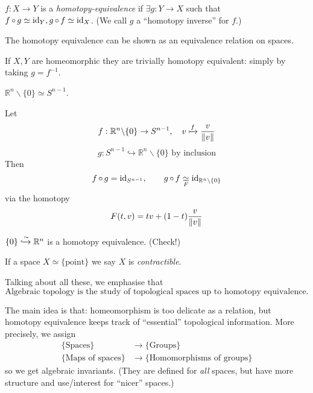 \documentclass[a4paper,11pt]{article}
\begin{document}
	\begin{defi}
		$f: X \to Y$ is a \emph{homotopy-equivalence} if $\exists g : Y \to X$ such that $f \operatorname{\circ} g \simeq \operatorname{id}_Y, g \operatorname{\circ} f \simeq \operatorname{id}_X$. (We call $g$ a ``homotopy inverse'' for $f$.)
	\end{defi}

	\begin{nt}
		The homotopy equivalence can be shown as an equivalence relation on spaces.
	\end{nt}

	\begin{ex}
		If $X,Y$ are homeomorphic they are trivially homotopy equivalent: simply by taking $g = f^{-1}$.
	\end{ex}

	\begin{ex}
		$\mathbb{R}^n \backslash \{0\} \simeq S^{n-1}$. 
		
		Let
		\[
			f: \mathbb{R}^n \backslash \{0\} \to S^{n-1}, \quad v \xmapsto{f} \frac{v}{\norm{v}}
		\]
		\[
			g: S^{n-1} \hookrightarrow \mathbb{R}^n \backslash \{0\} \text{ by inclusion}
		\]
		Then
		\[
			f \operatorname{\circ} g = \operatorname{id}_{S^{n-1}}, \qquad g \operatorname{\circ} f \underset{F}{\simeq} \operatorname{id}_{\mathbb{R}^n \backslash \{0\}}
		\]
		via the homotopy
		\[
			F(t,v) = tv + (1-t) \frac{v}{\norm{v}}
		\]
	\end{ex}

	\begin{ex}
		$\{0\} \xhookrightarrow{\sim} \mathbb{R}^n$ is a homotopy equivalence. (Check!)
	\end{ex}

	\begin{defi}
		If a space $X \simeq \{\text{point}\}$ we say $X$ is \emph{contractible}. 
	\end{defi}

	Talking about all these, we emphasise that
	\[
		\boxed{\text{Algebraic topology is the study of topological spaces up to homotopy equivalence.}}
	\]
	
	The main idea is that: homeomorphism is too delicate as a relation, but homotopy equivalence keeps track of ``essential'' topological information. More precisely, we assign
	\begin{align*}
		\{\text{Spaces}\} & \to \{\text{Groups}\}\\
		\{\text{Maps of spaces}\} & \to \{\text{Homomorphisms of groups}\}
	\end{align*}
	so we get algebraic invariants. (They are defined for \emph{all} spaces, but have more structure and use/interest for ``nicer'' spaces.)
\end{document}
